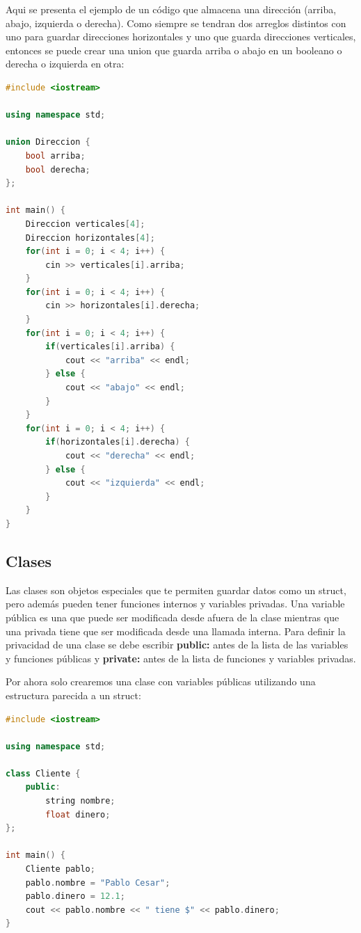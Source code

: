 \documentclass{article}
\begin{document}
Aqui se presenta el ejemplo de un código que almacena una dirección (arriba, abajo, izquierda o derecha). Como siempre se tendran dos arreglos distintos con uno para guardar direcciones horizontales y uno que guarda direcciones verticales, entonces se puede crear una union que guarda arriba o abajo en un booleano o derecha o izquierda en otra:

\begin{lstlisting}[language=C++, title=Uniones]
#include <iostream>

using namespace std;

union Direccion {
	bool arriba;
	bool derecha;
};

int main() {
	Direccion verticales[4];
	Direccion horizontales[4];
	for(int i = 0; i < 4; i++) {
		cin >> verticales[i].arriba;
	}
	for(int i = 0; i < 4; i++) {
		cin >> horizontales[i].derecha;
	}
	for(int i = 0; i < 4; i++) {
		if(verticales[i].arriba) {
			cout << "arriba" << endl;
		} else {
			cout << "abajo" << endl;
		}
	}
	for(int i = 0; i < 4; i++) {
		if(horizontales[i].derecha) {
			cout << "derecha" << endl;
		} else {
			cout << "izquierda" << endl;
		}
	}
}
\end{lstlisting}

\subsection{Clases}

Las clases son objetos especiales que te permiten guardar datos como un struct, pero además pueden tener funciones internos y variables privadas. Una variable pública es una que puede ser modificada desde afuera de la clase mientras que una privada tiene que ser modificada desde una llamada interna. Para definir la privacidad de una clase se debe escribir \textbf{public:} antes de la lista de las variables y funciones públicas y \textbf{private:} antes de la lista de funciones y variables privadas.

Por ahora solo crearemos una clase con variables públicas utilizando una estructura parecida a un struct:

\begin{lstlisting}[language=C++, title=Declarando clases]
#include <iostream>

using namespace std;

class Cliente {
	public:
		string nombre;
		float dinero;
};

int main() {
	Cliente pablo;
	pablo.nombre = "Pablo Cesar";
	pablo.dinero = 12.1;
	cout << pablo.nombre << " tiene $" << pablo.dinero;
}
\end{lstlisting}
\end{document}
